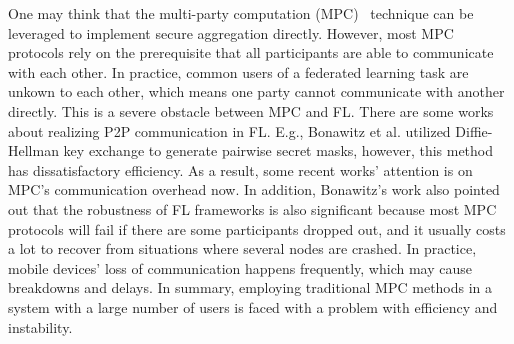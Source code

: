 One may think that the multi-party computation (MPC)~\cite{Yao1982Protocols} technique can be leveraged to implement secure aggregation directly. However, most MPC protocols rely on the prerequisite that all participants are able to communicate with each other. In practice, common users of a federated learning task are unkown to each other, which means one party cannot communicate with another directly. This is a severe obstacle between MPC and FL. There are some works about realizing P2P communication in FL. E.g., Bonawitz et al.\cite{Practical} utilized Diffie-Hellman key exchange to generate pairwise secret masks, however, this method has dissatisfactory efficiency. As a result, some recent works' attention is on MPC's communication overhead now\cite{Weighted,Two-Phase}. In addition, Bonawitz's work also pointed out that the robustness of FL frameworks is also significant because most MPC protocols will fail if there are some participants dropped out, and it usually costs a lot to recover from situations where several nodes are crashed. In practice, mobile devices' loss of communication happens frequently, which may cause breakdowns and delays. In summary, employing traditional MPC methods in a system with a large number of users is faced with a problem with efficiency and instability.


